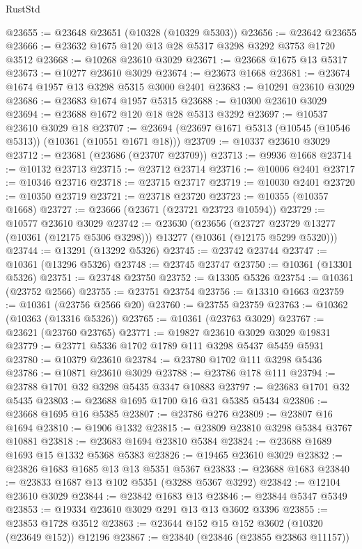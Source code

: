 \begin{lexlean}{RustStd}
\begin{coremodule}
@23655 := @23648 @23651 (@10328 (@10329 @5303))
@23656 := @23642 @23655
@23666 := @23632 @1675 @120 @13 @28 @5317 @3298 @3292 @3753 @1720 @3512
@23668 := @10268 @23610 @3029
@23671 := @23668 @1675 @13 @5317
@23673 := @10277 @23610 @3029
@23674 := @23673 @1668
@23681 := @23674 @1674 @1957 @13 @3298 @5315 @3000 @2401
@23683 := @10291 @23610 @3029
@23686 := @23683 @1674 @1957 @5315
@23688 := @10300 @23610 @3029
@23694 := @23688 @1672 @120 @18 @28 @5313 @3292
@23697 := @10537 @23610 @3029 @18
@23707 := @23694 (@23697 @1671 @5313 (@10545 (@10546 @5313)) (@10361 (@10551 @1671 @18)))
@23709 := @10337 @23610 @3029
@23712 := @23681 (@23686 (@23707 @23709))
@23713 := @9936 @1668
@23714 := @10132 @23713
@23715 := @23712 @23714
@23716 := @10006 @2401
@23717 := @10346 @23716
@23718 := @23715 @23717
@23719 := @10030 @2401
@23720 := @10350 @23719
@23721 := @23718 @23720
@23723 := @10355 (@10357 @1668)
@23727 := @23666 (@23671 (@23721 @23723 @10594))
@23729 := @10577 @23610 @3029
@23742 := @23630
    (@23656
      (@23727 @23729 @13277 (@10361 (@12175 @5306 @3298)))
      @13277
      (@10361 (@12175 @5299 @5320)))
@23744 := @13291 (@13292 @5326)
@23745 := @23742 @23744
@23747 := @10361 (@13296 @5326)
@23748 := @23745 @23747
@23750 := @10361 (@13301 @5326)
@23751 := @23748 @23750
@23752 := @13305 @5326
@23754 := @10361 (@23752 @2566)
@23755 := @23751 @23754
@23756 := @13310 @1663
@23759 := @10361 (@23756 @2566 @20)
@23760 := @23755 @23759
@23763 := @10362 (@10363 (@13316 @5326))
@23765 := @10361 (@23763 @3029)
@23767 := @23621 (@23760 @23765)
@23771 := @19827 @23610 @3029 @3029 @19831
@23779 := @23771 @5336 @1702 @1789 @111 @3298 @5437 @5459 @5931
@23780 := @10379 @23610
@23784 := @23780 @1702 @111 @3298 @5436
@23786 := @10871 @23610 @3029
@23788 := @23786 @178 @111
@23794 := @23788 @1701 @32 @3298 @5435 @3347 @10883
@23797 := @23683 @1701 @32 @5435
@23803 := @23688 @1695 @1700 @16 @31 @5385 @5434
@23806 := @23668 @1695 @16 @5385
@23807 := @23786 @276
@23809 := @23807 @16 @1694
@23810 := @1906 @1332
@23815 := @23809 @23810 @3298 @5384 @3767 @10881
@23818 := @23683 @1694 @23810 @5384
@23824 := @23688 @1689 @1693 @15 @1332 @5368 @5383
@23826 := @19465 @23610 @3029
@23832 := @23826 @1683 @1685 @13 @13 @5351 @5367
@23833 := @23688 @1683
@23840 := @23833 @1687 @13 @102 @5351 (@3288 @5367 @3292)
@23842 := @12104 @23610 @3029
@23844 := @23842 @1683 @13
@23846 := @23844 @5347 @5349
@23853 := @19334 @23610 @3029 @291 @13 @13 @3602 @3396
@23855 := @23853 @1728 @3512
@23863 := @23644 @152 @15 @152 @3602 (@10320 (@23649 @152)) @12196
@23867 := @23840 (@23846 (@23855 @23863 @11157))

\end{coremodule}
\end{lexlean}
